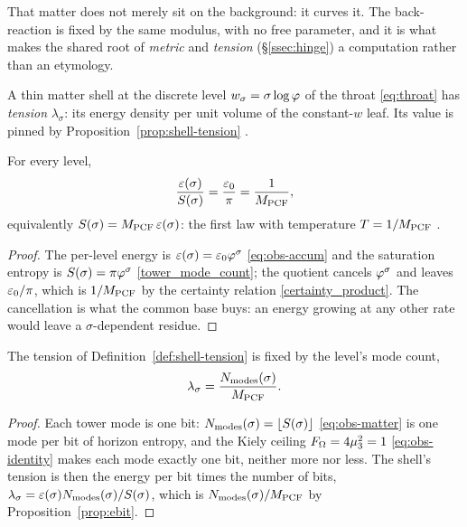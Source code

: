 %

That matter does not merely sit on the background: it curves it. The back-reaction is fixed by the
same modulus, with no free parameter, and it is what makes the shared root of \emph{metric} and
\emph{tension} (\S\ref{ssec:hinge}) a computation rather than an etymology.

\begin{definition}\label{def:shell-tension}
A thin matter shell at the discrete level $w_\sigma=\sigma\log\varphi$ of the throat
\eqref{eq:throat} has \emph{tension} $\lambda_\sigma$: its energy density per unit volume of the
constant-$w$ leaf. Its value is pinned by Proposition~\ref{prop:shell-tension} .
\end{definition}

\begin{proposition}\label{prop:ebit}
For every level,
\begin{equation}\label{eq:ebit}
  \frac{\varepsilon(\sigma)}{S(\sigma)}=\frac{\varepsilon_{0}}{\pi}=\frac{1}{M_{\mathrm{PCF}}},
\end{equation}
equivalently $S(\sigma)=M_{\mathrm{PCF}}\,\varepsilon(\sigma)$: the first law with temperature $T=1/M_{\mathrm{PCF}}$ .
\end{proposition}
\begin{proof}
The per-level energy is $\varepsilon(\sigma)=\varepsilon_{0}\varphi^{\sigma}$ \eqref{eq:obs-accum} and the
saturation entropy is $S(\sigma)=\pi\varphi^{\sigma}$ \eqref{tower_mode_count}; the quotient cancels
$\varphi^{\sigma}$ and leaves $\varepsilon_{0}/\pi$, which is $1/M_{\mathrm{PCF}}$ by the certainty relation
\eqref{certainty_product}. The cancellation is what the common base buys: an energy growing at any other
rate would leave a $\sigma$-dependent residue.
\end{proof}

\begin{proposition}\label{prop:shell-tension}
The tension of Definition~\ref{def:shell-tension} is fixed by the level's mode count,
\begin{equation}\label{shell_tension_from_mode_count}
  \lambda_\sigma=\frac{N_{\mathrm{modes}}(\sigma)}{M_{\mathrm{PCF}}}.
\end{equation}
\end{proposition}
\begin{proof}
Each tower mode is one bit: $N_{\mathrm{modes}}(\sigma)=\lfloor S(\sigma)\rfloor$ \eqref{eq:obs-matter} is one
mode per bit of horizon entropy, and the Kiely ceiling $F_\Omega=4\mu_{3}^{2}=1$
\eqref{eq:obs-identity} makes each mode exactly one bit, neither more nor less. The shell's tension
is then the energy per bit times the number of bits,
$\lambda_\sigma=\varepsilon(\sigma)N_{\mathrm{modes}}(\sigma)/S(\sigma)$, which is
$N_{\mathrm{modes}}(\sigma)/M_{\mathrm{PCF}}$ by Proposition~\ref{prop:ebit}.
\end{proof}

